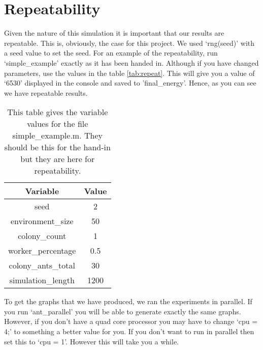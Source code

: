 \section{Repeatability}

Given the nature of this simulation it is important that our results are repeatable. This is, obviously, the case for this project. We used `rng(seed)' with a seed value to set the seed. For an example of the repeatability, run `simple\_example' exactly as it has been handed in. Although if you have changed parameters, use the values in the table \ref{tab:repeat}. This will give you a value of `6530' displayed in the console and saved to 'final\_energy'. Hence, as you can see we have repeatable results.\par

\begin{table}[htb]
\centering
\caption{This table gives the variable values for the file simple\_example.m. They should be this for the hand-in but they are here for repeatability.}
\label{repeat}
\begin{tabular}{@{}cc@{}}
\toprule
Variable          & Value \\ \midrule
seed              & 2     \\ \midrule
environment\_size  & 50    \\ \midrule
colony\_count      & 1     \\ \midrule
worker\_percentage & 0.5   \\ \midrule
colony\_ants\_total & 30    \\ \midrule
simulation\_length & 1200  \\ \bottomrule
\end{tabular}
\end{table}


To get the graphs that we have produced, we ran the experiments in parallel. If you run `ant\_parallel' you will be able to generate exactly the same graphs. However, if you don't have a quad core processor you may have to change `cpu = 4;' to something a better value for you. If you don't want to run in parallel then set this to `cpu = 1'. However this will take you a while.\par